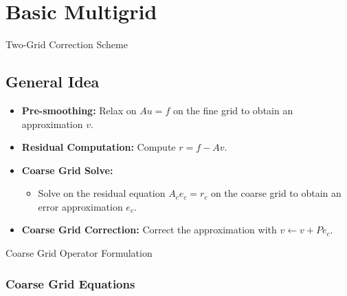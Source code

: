 \documentclass{beamer}
\begin{document}
\section{Basic Multigrid}

\begin{frame}{Two-Grid Correction Scheme}
\subsection*{General Idea}

\begin{itemize}
    \item \textbf{Pre-smoothing:} Relax on $Au = f$ on the fine grid to obtain an approximation $v$.
    \item \textbf{Residual Computation:} Compute $r = f - Av$.
    \item \textbf{Coarse Grid Solve:}
    \begin{itemize}
        \item Solve on the residual equation $A_{c}e_{c} = r_{c}$ on the coarse grid to obtain an error approximation $e_{c}$.
    \end{itemize}
    \item \textbf{Coarse Grid Correction:} Correct the approximation with $v \leftarrow v + Pe_{c}$.
\end{itemize}
\end{frame}

\begin{frame}{Coarse Grid Operator Formulation}
\subsubsection*{Coarse Grid Equations}


\begin{itemize}
    \end{itemize}
\end{frame}
\end{document}
